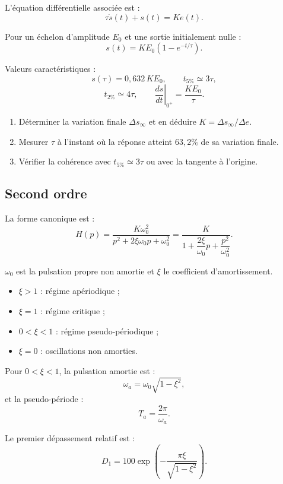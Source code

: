 L'équation différentielle associée est :
\[
\tau\dot{s}(t)+s(t)=K e(t).
\]

Pour un échelon d'amplitude $E_0$ et une sortie initialement nulle :
\[
\boxed{s(t)=K E_0\left(1-e^{-t/\tau}\right)}.
\]

\SAReponsePremierOrdre

Valeurs caractéristiques :
\[
s(\tau)=0{,}632\,K E_0,\qquad
t_{5\%}\simeq3\tau,
\]
\[
t_{2\%}\simeq4\tau,\qquad
\left.\frac{ds}{dt}\right|_{0^+}=\frac{K E_0}{\tau}.
\]

\begin{SAmethode}[title={Identifier un premier ordre sur une réponse indicielle}]
\begin{enumerate}
  \item Déterminer la variation finale $\Delta s_\infty$ et en déduire $K=\Delta s_\infty/\Delta e$.
  \item Mesurer $\tau$ à l'instant où la réponse atteint $63{,}2\%$ de sa variation finale.
  \item Vérifier la cohérence avec $t_{5\%}\simeq3\tau$ ou avec la tangente à l'origine.
\end{enumerate}
\end{SAmethode}

\subsection{Second ordre}

La forme canonique est :
\[
\boxed{H(p)=\frac{K\omega_0^2}{p^2+2\xi\omega_0p+\omega_0^2}}
=\frac{K}{1+\dfrac{2\xi}{\omega_0}p+\dfrac{p^2}{\omega_0^2}}.
\]

$\omega_0$ est la pulsation propre non amortie et $\xi$ le coefficient d'amortissement.

\begin{itemize}
  \item $\xi>1$ : régime apériodique ;
  \item $\xi=1$ : régime critique ;
  \item $0<\xi<1$ : régime pseudo-périodique ;
  \item $\xi=0$ : oscillations non amorties.
\end{itemize}

Pour $0<\xi<1$, la pulsation amortie est :
\[
\omega_a=\omega_0\sqrt{1-\xi^2},
\]
et la pseudo-période :
\[
T_a=\frac{2\pi}{\omega_a}.
\]

\SAReponseSecondOrdre

Le premier dépassement relatif est :
\[
\boxed{D_1=100\exp\left(-\frac{\pi\xi}{\sqrt{1-\xi^2}}\right)}.
\]

